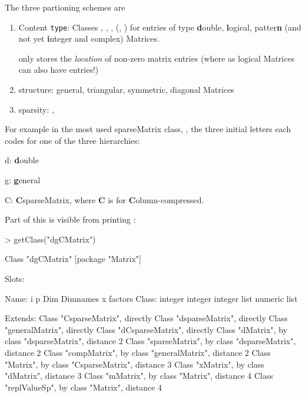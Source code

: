 \documentclass{article}
\begin{document}
The three partioning schemes are
\begin{enumerate}
\item Content \texttt{type}: Classes , ,
  ,
  (, ) for entries of type \textbf{d}ouble,
  \textbf{l}ogical, patter\textbf{n} (and not yet \textbf{i}nteger and
  complex) Matrices.

   only stores the
  \emph{location} of non-zero matrix entries (where as logical Matrices
  can also have  entries!)

\item structure: general, triangular, symmetric, diagonal Matrices

\item sparsity: , 

\end{enumerate}

For example in the most used sparseMatrix class, ,
the three initial letters  each codes for one of the three hierarchies:
\begin{description}
\item{d: } \textbf{d}ouble
\item{g: } \textbf{g}eneral
\item{C: } \textbf{C}sparseMatrix, where \textbf{C} is for \textbf{C}olumn-compressed.
\end{description}
Part of this is visible from printing :
\begin{Schunk}
\begin{Sinput}
> getClass("dgCMatrix")
\end{Sinput}
\begin{Soutput}
Class "dgCMatrix" [package "Matrix"]

Slots:
                                                            
Name:         i        p      Dim Dimnames        x  factors
Class:  integer  integer  integer     list  numeric     list

Extends: 
Class "CsparseMatrix", directly
Class "dsparseMatrix", directly
Class "generalMatrix", directly
Class "dCsparseMatrix", directly
Class "dMatrix", by class "dsparseMatrix", distance 2
Class "sparseMatrix", by class "dsparseMatrix", distance 2
Class "compMatrix", by class "generalMatrix", distance 2
Class "Matrix", by class "CsparseMatrix", distance 3
Class "xMatrix", by class "dMatrix", distance 3
Class "mMatrix", by class "Matrix", distance 4
Class "replValueSp", by class "Matrix", distance 4
\end{Soutput}
\end{Schunk}
\end{document}

